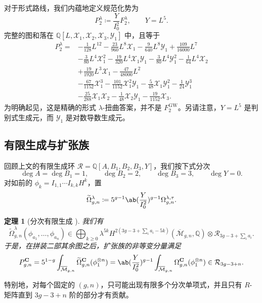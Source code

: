 \documentclass{amsart}
\newtheorem{thm}{定理}[section]
\theoremstyle{definition}
\theoremstyle{remark}
\theoremstyle{plain}
\theoremstyle{definition}
\theoremstyle{remark}
\newcommand{\Q}{\mathbb{Q}}
\newcommand{\Mbar}{\overline{\mathcal{M}}}
\newcommand{\mc}[1]{\mathcal{#1}}
\newcommand{\mbf}[1]{\mathbf{#1}}
\newcommand{\mr}[1]{\mathrm{#1}}
\newcommand{\wt}[1]{\widetilde{#1}}
\newcommand{\1}{\mathbf{1}}
\newcommand{\2}{\mathbf{2}}
\newcommand{\3}{\mathbf{3}}
\begin{document}
对于形式路线，我们内蕴地定义规范化势为
\[ P_2^{\lambda} \coloneqq \frac{Y}{I_0^2}F_2^{\lambda}, \qquad Y = L^5. \]
完整的图和落在 \(\Q[L,\mc{X}_1,\mc{X}_2,\mc{X}_3,\mc{Y}_1]\) 中，且等于
\begin{align*}
    P_2^{\lambda} ={}& -\frac{1}{128}L^{12} - \frac{23}{960}L^8\mc{X}_1 - \frac{9}{640}L^8\mc{Y}_1 + \frac{109}{16000}L^7 \\
    &- \frac{3}{80}L^4\mc{X}_1^2 - \frac{19}{320}L^4\mc{X}_1\mc{Y}_1 - \frac{3}{80}L^4\mc{Y}_1^2 - \frac{1}{64}L^4\mc{X}_2 \\
    &+ \frac{19}{1920}L^3\mc{X}_1 - \frac{47}{48000}L^2 \\
    &- \frac{67}{1152}\mc{X}_1^3 - \frac{101}{1152}\mc{X}_1^2\mc{Y}_1 - \frac{5}{48}\mc{X}_1\mc{Y}_1^2 - \frac{1}{24}\mc{Y}_1^3 \\
    &- \frac{25}{288}\mc{X}_1\mc{X}_2 - \frac{1}{48}\mc{X}_2\mc{Y}_1 - \frac{19}{1152}\mc{X}_3.
\end{align*}
为明确起见，这是精确的形式 \(\lambda\)-扭曲答案，并不是 \(F_2^{\mr{GW}}\)。另请注意，\(Y = L^5\) 是判别式生成元，而 \(\mc{Y}_1\) 是对数导数生成元。

\subsection{有限生成与扩张族}%
\label{sub:Finite generation and the extended family}

回顾上文的有限生成环 \(\mc{R} = \Q[A,B_1,B_2,B_3,Y]\)，我们按下式分次
\[ \deg A = \deg B_1 = 1, \qquad \deg B_2 = 2, \qquad \deg B_3 = 3, \qquad \deg Y = 0. \]
对如前的 \(\phi_k = I_{1,1}\cdots I_{k,k}H^k\)，置
\[ \wt{\Omega}^{\lambda}_{g,n} \coloneqq 5^{g-1}\ab(\frac{Y}{I_0^2})^{g-1}\Omega^{\lambda,\tau}_{g,n}. \]

\begin{thm}[分次有限生成 {\cite{GJRstructure}}]%
\label{thm:graded finite generation}
    我们有
    \[ \wt{\Omega}^{\lambda}_{g,n}(\phi_{a_1}, \ldots, \phi_{a_n}) \in \bigoplus_{k \geq 0}\lambda^{5k}H^{2(3g-3+\sum_i a_i - 5k)}(\Mbar_{g,n},\Q)\otimes \mc{R}_{3g-3+\sum_i a_i}. \]
    于是，在拼装二部其余图之后，扩张族的非等变分量满足
    \[ P^{\mbf{C}}_{g,n} = 5^{1-g}\int_{\Mbar_{g,n}}\wt{\Omega}^{\mbf{C}}_{g,n}(\phi_1^{\otimes n}) = \ab( \frac{Y}{I_0^2})^{g-1}\int_{\Mbar_{g,n}}\Omega^{\mbf{C}}_{g,n}(\phi_1^{\otimes n}) \in \mc{R}_{3g-3+n}. \]
\end{thm}

特别地，对每个固定的 \((g,n)\)，只可能出现有限多个分次单项式，并且只有 \(R\)-矩阵直到 \(3g-3+n\) 阶的部分才有贡献。
\end{document}
